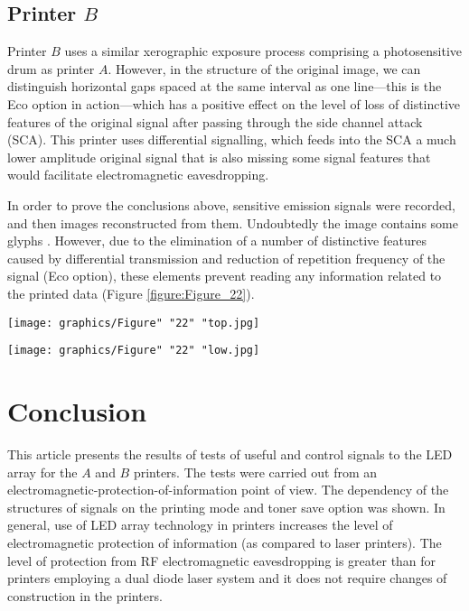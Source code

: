 \documentclass[letterpaper,journal]{ieeetran}
\begin{document}
\subsection{Printer $B$}

Printer $B$ uses a similar xerographic exposure process comprising a
photosensitive drum as printer $A$. However, in the structure of the original
image, we can distinguish horizontal gaps spaced at the same interval as one
line---this is the Eco option in action---which has a positive effect on the
level of
loss of distinctive features of the original signal after passing through the
side channel attack (SCA). This printer uses differential signalling, which
feeds into the SCA a much lower amplitude original signal that is also
missing some signal features that would facilitate electromagnetic
eavesdropping.

In order to prove the conclusions above, sensitive emission signals were
recorded, and then images reconstructed from them. Undoubtedly the image
contains some glyphs \cite{Jalilian2014a}. However, due to the
elimination of a number of distinctive features caused by differential
transmission and reduction of repetition frequency of the signal (Eco
option), these elements prevent reading any information related to the
printed data (Figure \ref{figure:Figure_22}).

\begin{figure*}[ht]
    \centering
    \texttt{[image: graphics/Figure" "22" "top.jpg]}

    \bigskip

    \texttt{[image: graphics/Figure" "22" "low.jpg]}
    \caption{Printer $B$ with LED array, $600\times 600$\,dpi with toner
        save (image is inverted). Measured frequency of sensitive emission
        $f_0 = 384$\,\si{\mega\hertz}, $\text{BW}=2$\,\si{\mega\hertz}.}
    \label{figure:Figure_22}
\end{figure*}

\section{Conclusion}

This article presents the results of tests of useful and control signals to
the LED array for the $A$ and $B$ printers. The tests were carried out from
an electromagnetic-protection-of-information point of view. The dependency of
the structures of signals on the printing mode and toner save option was
shown. In general, use of LED array technology in printers increases the
level of electromagnetic protection of information (as compared to laser
printers). The level of protection from RF electromagnetic eavesdropping is
greater than for printers employing a dual diode laser system
\cite{Kubiak2018c} and it does not require changes of construction in the
printers.
\end{document}

